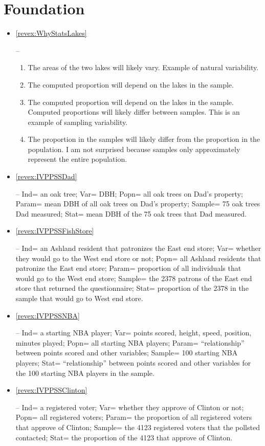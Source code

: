 \documentclass[10pt,openany]{book}\usepackage[]{graphicx}\usepackage[]{color}
\begin{document}
\section*{Foundation}
\begin{itemize}
  \item \hypertarget{ans:WhyStatsLakes}{\ref{revex:WhyStatsLakes}} --
    \begin{enumerate}
      \item The areas of the two lakes will likely vary.  Example of natural variability.
      \item The computed proportion will depend on the lakes in the sample.
      \item The computed proportion will depend on the lakes in the sample.  Computed proportions will likely differ between samples.  This is an example of sampling variability.
      \item The proportion in the samples will likely differ from the proportion in the population.  I am not surprised because samples only approximately represent the entire population.
    \end{enumerate}

  \item \hypertarget{ans:IVPPSSDad}{\ref{revex:IVPPSSDad}} -- Ind= an oak tree; Var= DBH; Popn= all oak trees on Dad's property; Param= mean DBH of all oak trees on Dad's property; Sample= 75 oak trees Dad measured; Stat= mean DBH of the 75 oak trees that Dad measured.

  \item \hypertarget{ans:IVPPSSFishStore}{\ref{revex:IVPPSSFishStore}} -- Ind= an Ashland resident that patronizes the East end store; Var= whether they would go to the West end store or not; Popn= all Ashland residents that patronize the East end store; Param= proportion of all individuals that would go to the West end store; Sample= the 2378 patrons of the East end store that returned the questionnaire; Stat= proportion of the 2378 in the sample that would go to West end store.

  \item \hypertarget{ans:IVPPSSNBA}{\ref{revex:IVPPSSNBA}} -- Ind= a starting NBA player; Var= points scored, height, speed, position, minutes played; Popn= all starting NBA players; Param= ``relationship'' between points scored and other variables; Sample= 100 starting NBA players; Stat= ``relationship'' between points scored and other variables for the 100 starting NBA players in the sample.

  \item \hypertarget{ans:IVPPSSClinton}{\ref{revex:IVPPSSClinton}} -- Ind= a registered voter; Var= whether they approve of Clinton or not; Popn= all registered voters; Param= the proportion of all registered voters that approve of Clinton; Sample= the 4123 registered voters that the pollsted contacted; Stat= the proportion of the 4123 that approve of Clinton.


\end{itemize}
\end{document}
